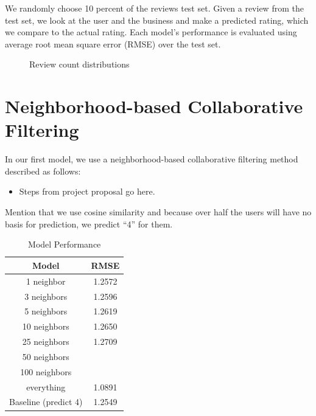 \documentclass[10pt, letterpaper]{article}
\begin{document}
We randomly choose 10 percent of the reviews test set. Given a review 
from the test set, we look at the user and the business and make a predicted 
rating, which we compare to the actual rating. Each model's performance is 
evaluated using average root mean square error (RMSE) over the test set.


\begin{figure}[htb]
  \centering

            \caption{Review count distributions}
            \label{review_count}

\end{figure}

\section{Neighborhood-based Collaborative Filtering}
In our first model, we use a neighborhood-based collaborative filtering method 
described as follows:
\begin{itemize}
\item Steps from project proposal go here. 
\end{itemize}

Mention that we use cosine similarity and because over half the users will have 
no basis for prediction, we predict ``4'' for them.

\begin{table}[htb]
\centering
\begin{tabular}{|c|c|}
\hline
{\bf Model} &{\bf RMSE} \tabularnewline \hline
1 neighbor &1.2572 \tabularnewline
3 neighbors &1.2596 \tabularnewline
5 neighbors &1.2619 \tabularnewline
10 neighbors &1.2650 \tabularnewline
25 neighbors &1.2709 \tabularnewline
50 neighbors & \tabularnewline
100 neighbors & \tabularnewline
everything &1.0891 \tabularnewline
Baseline (predict 4) &1.2549
\tabularnewline \hline

\end{tabular}
\caption{ Model Performance }
\label{ncf}
\end{table}
\end{document}
